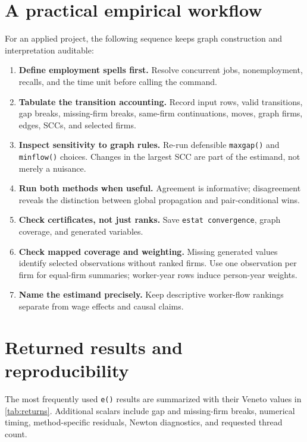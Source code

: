 \documentclass[11pt]{article}
\begin{document}
\section{A practical empirical workflow}
\label{sec:workflow}

For an applied project, the following sequence keeps graph construction and
interpretation auditable:
\begin{enumerate}
  \item \textbf{Define employment spells first.} Resolve concurrent jobs,
  nonemployment, recalls, and the time unit before calling the command.
  \item \textbf{Tabulate the transition accounting.} Record input rows, valid
  transitions, gap breaks, missing-firm breaks, same-firm continuations, moves,
  graph firms, edges, SCCs, and selected firms.
  \item \textbf{Inspect sensitivity to graph rules.} Re-run defensible
  \texttt{maxgap()} and \texttt{minflow()} choices. Changes in the largest SCC
  are part of the estimand, not merely a nuisance.
  \item \textbf{Run both methods when useful.} Agreement is informative;
  disagreement reveals the distinction between global propagation and
  pair-conditional wins.
  \item \textbf{Check certificates, not just ranks.} Save
  \texttt{estat convergence}, graph coverage, and generated variables.
  \item \textbf{Check mapped coverage and weighting.} Missing generated values
  identify selected observations without ranked firms. Use one observation
  per firm for equal-firm summaries; worker-year rows induce person-year weights.
  \item \textbf{Name the estimand precisely.} Keep descriptive worker-flow
  rankings separate from wage effects and causal claims.
\end{enumerate}

\section{Returned results and reproducibility}
\label{sec:returns}

The most frequently used \texttt{e()} results are summarized with their
Veneto values in \cref{tab:returns}. Additional scalars include gap and
missing-firm breaks, numerical timing, method-specific residuals, Newton
diagnostics, and requested thread count.

\begin{table}[htbp]
\centering
\caption{Selected stored results after the Veneto run}
\label{tab:returns}
\small

\end{table}
\end{document}
